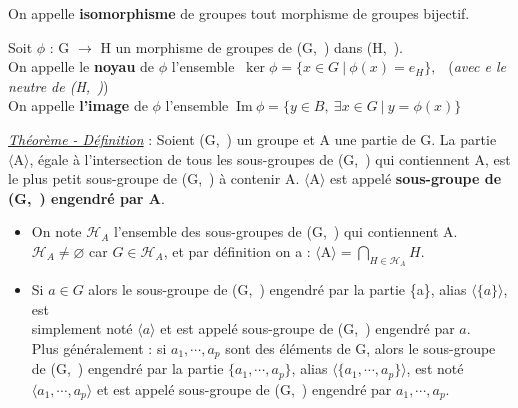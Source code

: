 \noindent On appelle \textbf{isomorphisme} de groupes tout morphisme de groupes bijectif.

\vspace{1cm} 

Soit \( \phi\) : G \(\to\) H un morphisme de groupes de (G,\ \lci) dans (H,\ \lce). \\
On appelle le \textbf{noyau} de \(\phi\) l'ensemble \(\ \ker \phi = \{ x\in G\ | \ \phi (x)=e_H\},\ \ \) (\emph{avec e le neutre de (H,\ \lce)})\\
On appelle \textbf{l'image} de \(\phi\) l'ensemble \(\ \text{Im}\ \phi = \{ y\in B,\ \exists x\in G \ |\ y=\phi(x) \} \)

\vspace{1.3cm}

\underline{\emph{Théorème - Définition}} : Soient (G,\ \lci) un groupe et A une partie de G. La partie \(\bigl \langle \text{A} \bigr \rangle\), égale à l'intersection de tous les sous-groupes de (G,\ \lci) qui contiennent A, est le plus petit sous-groupe de (G,\ \lci) à contenir A. \(\bigl \langle \text{A} \bigr \rangle\) est appelé \textbf{sous-groupe de (G,\ \lci) engendré par A}.\vspace{0.1cm} 
\begin{itemize}[leftmargin=1.5cm,label=•]
    \item On note \(\mathcal{H}_A\) l'ensemble des sous-groupes de (G,\ \lci) qui contiennent A.\\
    \(\mathcal{H}_A\neq \varnothing\) car \(G\in \mathcal{H}_A\), et par définition on a : \(\displaystyle \bigl \langle \text{A} \bigr \rangle = \bigcap_{H\in \mathcal{H}_A}\!\!H.\)\vspace{0.1cm}

    \item Si \(a\in G\) alors le sous-groupe de (G,\ \lci) engendré par la partie \{a\}, alias \(\bigl \langle \{a\} \bigr \rangle\), est \\
    simplement noté \(\bigl \langle a \bigr \rangle\) et est appelé sous-groupe de (G,\ \lci) engendré par $a$.\vspace{0.1cm}\\
    Plus généralement : si \(a_1,\cdots,a_p\) sont des éléments de G, alors le sous-groupe de (G,\ \lci) engendré par la partie \(\{a_1,\cdots,a_p\}\), alias \(\bigl \langle \{a_1,\cdots,a_p\} \bigr \rangle\), est noté \(\bigl \langle a_1,\cdots,a_p \bigr \rangle\) et est appelé sous-groupe de (G,\ \lci) engendré par \(a_1,\cdots,a_p\).
\end{itemize}

